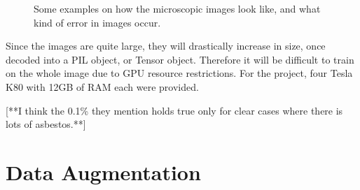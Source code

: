 \begin{figure}[t]
\centering
{}


\caption{Some examples on how the microscopic images look like, and what kind of error in images occur.}
\label{fig:basic_examples}
\end{figure}

Since the images are quite large, they will drastically increase in size, once decoded into a PIL object, or Tensor object. Therefore it will be difficult to train on the whole image due to GPU resource restrictions. For the project, four Tesla K80 with 12GB of RAM each were provided.

[**I think the 0.1\% they mention holds true only for clear cases where there is lots of asbestos.**]

\section{Data Augmentation}

